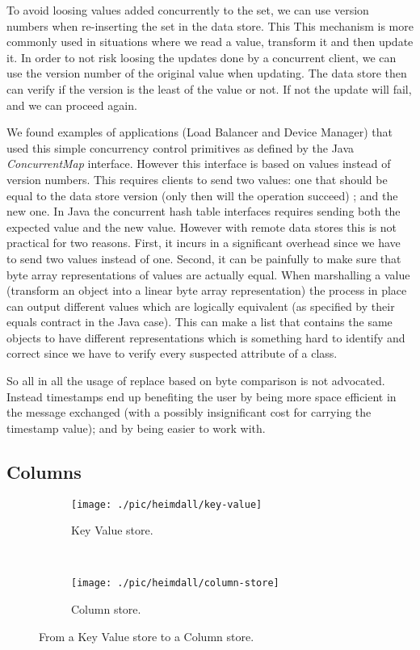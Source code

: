  To avoid loosing values added concurrently to the set, we can use version numbers when re-inserting the set in the data store. This 
This mechanism is more commonly used in situations where we read a value, transform it and then update it. In order to not risk loosing the updates done by a concurrent client, we can use the version number of the original value when updating. The data store then can verify if the version is the least of the value or not. If not the update will fail, and we can proceed again.  

We found examples of applications (Load Balancer and Device Manager) that used this simple concurrency control primitives as defined by the Java \emph{ConcurrentMap} interface. However this interface is based on values instead of version numbers. This requires clients to send two values: one that should be equal to the data store version (only then will the operation succeed)  ; and the new one. 
In Java the concurrent hash table interfaces requires sending both the expected value and the new value. 
However with remote data stores this is not practical for two reasons. 
First, it incurs in a significant overhead since we have to send two values instead of one.
Second, it can be painfully to make sure that byte array representations of values are actually equal. When marshalling a value (transform an object into a linear byte array representation) the process in place can output different values which are logically equivalent (as specified by their equals contract in the Java case).  This can make a list that contains the same objects to have different representations which is something hard to identify and correct since we have to verify every suspected attribute of a class. 

So all in all the usage of replace based on byte comparison is not advocated. Instead timestamps end up benefiting the user by being more space efficient in the message exchanged (with a possibly insignificant cost for carrying the timestamp value); and by being easier to work with. 

\subsection{Columns}
\label{sec:heimdall:columns}
\begin{figure}[ht]
  \centering
  \begin{subfigure}[b]{0.5\textwidth}
                \centering
                \texttt{[image: ./pic/heimdall/key-value]}
                \caption{Key Value store.} 
                \label{fig:heimdall:columns-0}

        \end{subfigure}%
        ~
        \begin{subfigure}[b]{0.5\textwidth}
                \centering
                \texttt{[image: ./pic/heimdall/column-store]}
                \caption{Column store.}
                \label{fig:heimdall:columns-1}
        \end{subfigure}
  \caption{From a Key Value store to a Column store. }
  \label{fig:heimdall:columns} 
\end{figure}

